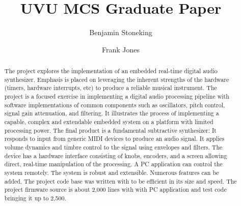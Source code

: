 \documentclass[acmlarge,screen]{acmart}
\begin{document}
\title{UVU MCS Graduate Paper}


\author{Benjamin Stoneking}

\author{Frank Jones}

\renewcommand{\shortauthors}{Candidate First Last}

\begin{abstract}
	The project explores the implementation of an embedded real-time digital audio synthesizer. Emphasis is placed on leveraging the inherent strengths of the hardware (timers, hardware interrupts, etc) to produce a reliable musical instrument. The project is a focused exercise in implementing a digital audio processing pipeline with software implementations of common components such as oscillators, pitch control, signal gain attenuation, and filtering. It illustrates the process of implementing a capable, complex and extendable embedded system on a platform with limited processing power. The final product is a fundamental subtractive synthesizer: It responds to input from generic MIDI devices to produce an audio signal. It applies volume dynamics and timbre control to the signal using envelopes and filters. The device has a hardware interface consisting of knobs, encoders, and a screen allowing direct, real-time manipulation of the processing. A PC application can control the system remotely. The system is robust and extensible. Numerous features can be added. The project code base was written with to be efficient in its size and speed. The project firmware source is about 2,000 lines with with PC application and test code bringing it up to 2,500.
\end{abstract}
\end{document}
